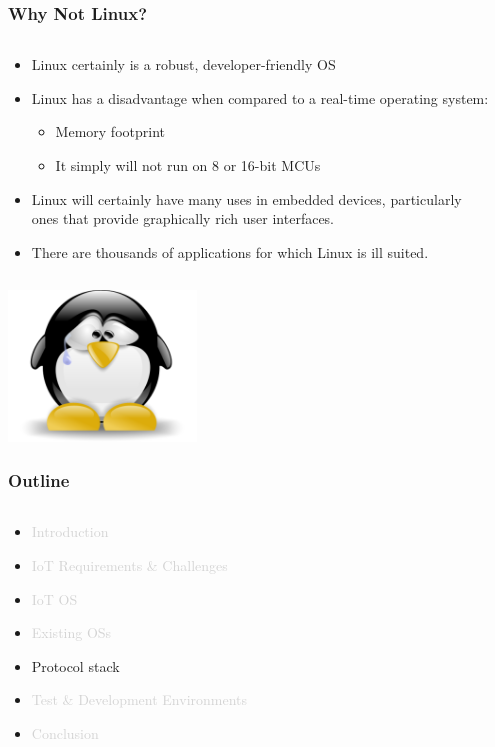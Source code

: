 \documentclass{beamer}
\begin{document}
\begin{frame}
	\frametitle{Why Not Linux?}
	\begin{columns}[c]
		\begin{column}{30cm}
			\vspace{.1cm}
			\begin{itemize}
				\justifying
				\item Linux certainly is a robust, developer-friendly OS
				\item Linux has a disadvantage when compared to a real-time operating system:
				\begin{itemize}
					\justifying
					\item Memory footprint
					\item It simply will not run on 8 or 16-bit MCUs
				\end{itemize}
				\item Linux will certainly have many uses in embedded devices, particularly\\
				ones that provide graphically rich user interfaces.
				\item There are thousands of applications for which Linux is ill suited.
			\end{itemize}
		\end{column}
	\end{columns}
	\vspace{.5cm}
	\hspace*{5.5cm} \includegraphics[width=5cm]{figs/tux-sad.png}
\end{frame}

\begin{frame}
	\frametitle{Outline}
	\begin{columns}[c]
		\begin{column}{30cm}
			\vspace{.1cm}
			\begin{itemize}
				\justifying
				\item \textcolor{LightGray}{Introduction}
				\item \textcolor{LightGray}{IoT Requirements \& Challenges}
				\item \textcolor{LightGray}{IoT OS}
				\item \textcolor{LightGray}{Existing OSs}
				\item Protocol stack
				\item \textcolor{LightGray}{Test \& Development Environments}
				\item \textcolor{LightGray}{Conclusion}
			\end{itemize}
		\end{column}
	\end{columns}
\end{frame}
\end{document}
